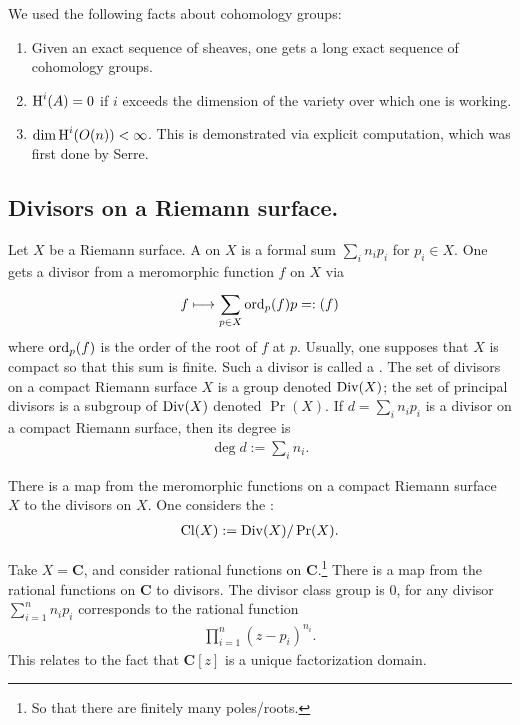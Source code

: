 \documentclass [11 pt, oneside] {article}
\begin{document}
We used the following facts about cohomology groups:
\begin{enumerate}
	\item Given an exact sequence of sheaves, one gets a long exact sequence of cohomology groups.
	\item $\operatorname{H}^i(\relax{A})= 0$ if $i$ exceeds the dimension of the variety over which one is working.
	\item $\dim \operatorname{H}^i(\relax{O}(n)) <\infty$. This is demonstrated via explicit computation, which was first done by Serre.
\end{enumerate}

\subsection{Divisors on a Riemann surface.}
Let $X$ be a Riemann surface. A  on $X$ is a formal sum $\sum_{i}^{} n_ip_i$ for $p_i\in X$. One gets a divisor from a meromorphic function $f$ on $X$ via
\begin{align*}
	f\longmapsto \sum_{p\in X}^{} \operatorname{ord}_p(f)p =: (f)
\end{align*}
where $\operatorname{ord}_p(f)$ is the order of the root of $f$ at $p$. Usually, one supposes that $X$ is compact so that this sum is finite. Such a divisor is called a . The set of divisors on a compact Riemann surface $X$ is a group denoted $\operatorname{Div}(X)$; the set of principal divisors is a subgroup of $\operatorname{Div}(X)$ denoted $\Pr(X)$. If $d=\sum_{i}^{} n_ip_i$ is a divisor on a compact Riemann surface, then its degree is
\begin{align*}
	\deg d := \sum_{i}^{} n_i.
\end{align*}

There is a map from the meromorphic functions on a compact Riemann surface $X$ to the divisors on $X$. One considers the :
\begin{align*}
	\operatorname{Cl}(X) := \operatorname{Div} (X)/\operatorname{Pr} (X).
\end{align*}

\begin{example}[ ]\label{}\text{}
Take $X= \mathbf{C}$, and consider rational functions on $\mathbf{C}$.\footnote{So that there are finitely many poles/roots.} There is a map from the rational functions on $\mathbf{C}$ to divisors. The divisor class group is $0$, for any divisor $\sum_{i=1}^{n} n_ip_i$ corresponds to the rational function
\begin{align*}
	\prod_{i=1}^n (z-p_i)^{n_i}.
\end{align*}
This relates to the fact that $\mathbf{C}[z]$ is a unique factorization domain.
\end{example}
\end{document}
